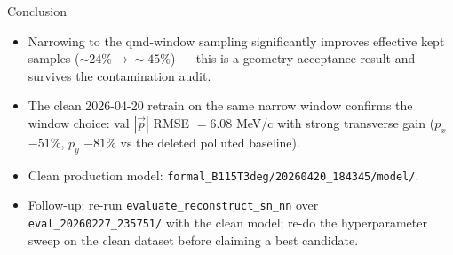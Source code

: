 \documentclass[11pt]{beamer}
\begin{document}
\begin{frame}{Conclusion}
\begin{itemize}
\item Narrowing to the qmd-window sampling significantly improves
effective kept samples (\(\sim24\%\rightarrow\sim45\%\)) --- this is a
geometry-acceptance result and survives the contamination audit.
\item The clean 2026-04-20 retrain on the same narrow window confirms
the window choice: val \(|\vec p|\) RMSE \(= 6.08\) MeV/c with strong
transverse gain (\(p_x\) \(-51\%\), \(p_y\) \(-81\%\) vs the deleted polluted
baseline).
\item Clean production model: \texttt{formal\_B115T3deg/20260420\_184345/model/}.
\item Follow-up: re-run \texttt{evaluate\_reconstruct\_sn\_nn} over
\texttt{eval\_20260227\_235751/} with the clean model; re-do the
hyperparameter sweep on the clean dataset before claiming a best candidate.
\end{itemize}
\end{frame}
\end{document}
